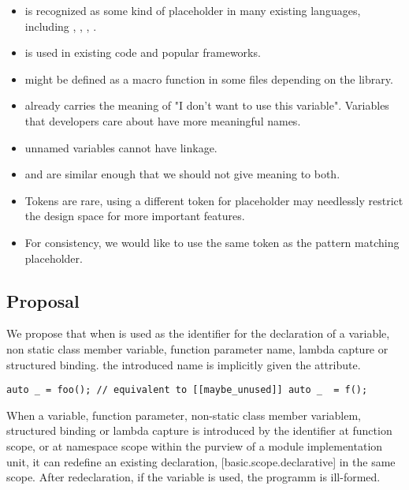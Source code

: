 \documentclass{wg21}
\begin{document}
\begin{itemize}
\item \tcode{_} is recognized as some kind of placeholder in many existing languages, including , , , .
\item \tcode{_} is used in existing code and popular frameworks.
\item \tcode{_} might be defined as a macro function in some files depending on the  library.
\item \tcode{_} already carries the meaning of "I don't want to use this variable". Variables that developers care about have more meaningful names.
\item \tcode{_} unnamed variables cannot have linkage.
\item \tcode{_} and \tcode{__} are similar enough that we should not give meaning to both.
\item Tokens are rare, using a different token for placeholder may needlessly restrict the design space for more important features.
\item For consistency, we would like to use the same token as the pattern matching placeholder.
\end{itemize}

\subsection{Proposal}

We propose that when \tcode{_} is used as the identifier for the declaration of a variable, non static class member variable, function parameter name,
lambda capture or structured binding.
the introduced name is implicitly given the  attribute.

\begin{example}
\begin{lstlisting}[style=color]
auto _ = foo(); // equivalent to [[maybe_unused]] auto _  = f();
\end{lstlisting}
\end{example}

When a variable, function parameter, non-static class member variablem, structured binding or lambda capture is introduced by the identifier \tcode{_}
at function scope, or at namespace scope within the purview of a module implementation unit, it can redefine an existing declaration, [basic.scope.declarative] in the same scope. After redeclaration, if the variable is used, the programm is ill-formed.
\end{document}
